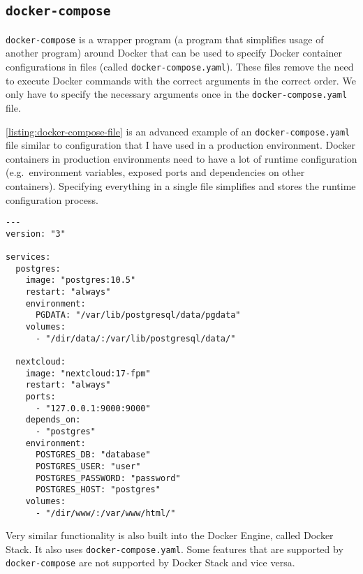 \subsection{\texorpdfstring{\lstinline{docker-compose}}{docker-compose}}
\lstinline{docker-compose} is a wrapper program (a program that simplifies usage of another program) around Docker that can be used to specify Docker container configurations in files (called \lstinline{docker-compose.yaml}). These files remove the need to execute Docker commands with the correct arguments in the correct order. We only have to specify the necessary arguments once in the \lstinline{docker-compose.yaml} file.

\medskip

\autoref{listing:docker-compose-file} is an advanced example of an \lstinline{docker-compose.yaml} file similar to configuration that I have used in a production environment. Docker containers in production environments need to have a lot of runtime configuration (e.g.\ environment variables, exposed ports and dependencies on other containers). Specifying everything in a single file simplifies and stores the runtime configuration process.
\begin{lstlisting}[caption={Example \lstinline{docker-compose.yaml}.},label={listing:docker-compose-file},captionpos=b]
---
version: "3"

services:
  postgres:
    image: "postgres:10.5"
    restart: "always"
    environment:
      PGDATA: "/var/lib/postgresql/data/pgdata"
    volumes:
      - "/dir/data/:/var/lib/postgresql/data/"

  nextcloud:
    image: "nextcloud:17-fpm"
    restart: "always"
    ports:
      - "127.0.0.1:9000:9000"
    depends_on:
      - "postgres"
    environment:
      POSTGRES_DB: "database"
      POSTGRES_USER: "user"
      POSTGRES_PASSWORD: "password"
      POSTGRES_HOST: "postgres"
    volumes:
      - "/dir/www/:/var/www/html/"
\end{lstlisting}

Very similar functionality is also built into the Docker Engine, called Docker Stack. It also uses \lstinline{docker-compose.yaml}. Some features that are supported by \lstinline{docker-compose} are not supported by Docker Stack and vice versa.
